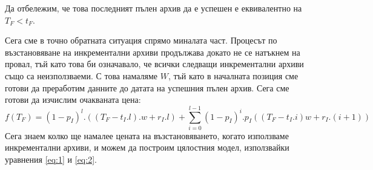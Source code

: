 \documentclass[11pt, a4paper]{article}
\theoremstyle{definition}
\begin{document}
				Да отбележим, че това последният пълен архив да е успешен е еквивалентно на $T_F<t_F$.\par
				Сега сме в точно обратната ситуация спрямо миналата част. Процесът по възстановяване на инкрементални архиви продължава докато не се натъкнем на провал, тъй като това би означавало, че всички следващи инкрементални архиви също са неизползваеми. С това намаляме $W$, тъй като в началната позиция сме готови да преработим данните до датата на успешния пълен архив. Сега сме готови да изчислим очакваната цена:
				\begin{equation}
					\label{eq:2}
					f(T_F) = (1-p_I)^l.((T_F-t_I.l).w + r_I.l) + \displaystyle \sum_{i=0}^{l-1} (1-p_I)^{i}.p_I((T_F-t_I.i)w + r_I.(i+1))
				\end{equation}
				Сега знаем колко ще намалее цената на възстановяването, когато използваме инкрементални архиви, и можем да построим цялостния модел, използвайки уравнения \ref{eq:1} и \ref{eq:2}.
\end{document}
